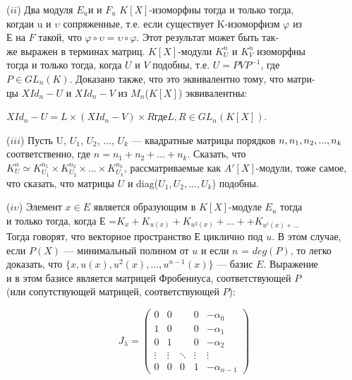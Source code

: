 \documentclass{../template/mai_book}
\begin{document}
($\mathit{ii} $) Два модуля $E_u$и и $F_u$ $K[X]$-изоморфны тогда и только тогда,\\ когдаи u и $\upsilon$ сопряженные, т.е. если существует K-изоморфизм $\varphi$ из\\
$Е$ на $F$ такой, что $\varphi\circ\upsilon = \upsilon\circ\varphi$. Этот результат может быть 
так-\\же выражен в терминах матриц. $K[X]$-модули $K^n_U$ и $K^n_V$ изоморфны\\
тогда и только тогда, когда $U$ и $V$ подобны, т.е. $U = PVP^{-1}$, где\\ 
$P \in GL_n(K)$. Доказано также, что это эквивалентно тому, что 
матри-\\цы  $XId_n - U$ и $XId_n - V$ из $M_n$($K[X]$) эквивалентны:

\medskip

$XId_n - U = L\times (XId_n - V)\times R$\;\;где\;\;$L,R\in GL_n(K[X])$. 

\medskip

($\mathit{iii} $) Пусть U, $U_1$, $U_2$, ..., $U_k$ — квадратные матрицы порядков  
$n,\\n_1, n_2,..., n_k $ соответственно, где $n=n_1+n_2+...+ n_k $. Сказать, что\\
$ K^n_U\simeq K^{n_1}_{U_1}\times K^{n_2}_{U_2}\times...\times K^{n_k}_{U_k} $, рассматриваемые как $A'[X]$-модули, тоже 
самое, что сказать, что матрицы $U$ и diag($U_1, U_2,..., U_k$) подобны.

\medskip

($\mathit{i}\upsilon $) Элемент $x\in E$ является образующим в $K[X]$-модуле $E_u$ тогда\\
и только тогда, когда Е =$ K_x + K_{u(x)} + K_{u^2(x)}+...++ K_{u^i(x)+...} $\\ 
Тогда говорят, что векторное пространство $Е$ циклично под $u$. В этом 
случае, если $P(X)$ — минимальный полином от $u$ и если $n$ = $deg(P)$, то 
легко доказать, что $\{x, u(x), u^2(x),..., u^{n-1}(x)\}$ — базис $E$. Выражение\\
и в этом базисе является матрицей Фробениуса, соответствующей $P$ \\
(или сопутствующей матрицей, соответствующей $P$): 

\medskip

$$J_{\lambda} = \begin{pmatrix}
0 & 0 & \; & 0 & -\alpha_0 \\
1 & 0 & \; & 0 & -\alpha_1 \\
0 & 1 & \; & 0 & -\alpha_2 \\
\vdots & \vdots & \ddots & \vdots & \vdots \\
0 & 0 & 0 & 1 & -\alpha_{n-1}
\end{pmatrix}
$$
\end{document}
